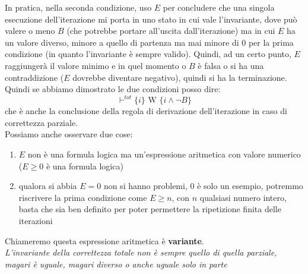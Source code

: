 \documentclass[a4paper,12pt, oneside]{book}
\begin{document}
In pratica, nella seconda condizione, uso $E$ per concludere che una singola
esecuzione dell'iterazione mi porta in uno stato in cui vale l'invariante, dove
può valere o meno $B$ (che potrebbe portare all'uscita dall'iterazione) ma in
cui $E$ ha un valore diverso, minore a quello di partenza ma mai minore di 0 per
la prima condizione (in quanto l'invariante è sempre valido). Quindi, ad un
certo punto, $E$ raggiungerà il valore minimo e in quel momento o $B$ è falsa o
si ha una contraddizione ($E$ dovrebbe diventare negativo), quindi si ha la
terminazione. \\
Quindi se abbiamo dimostrato le due condizioni posso dire:
\[\vdash^{tot}\{i\}\mbox{ W }\{i\land\neg B\}\]
che è anche la conclusione della regola di derivazione dell'iterazione in caso
di correttezza parziale.\\
Possiamo anche osservare due cose:
\begin{enumerate}
  \item $E$ non è una formula logica ma un'espressione aritmetica con valore
  numerico ($E\geq 0$ è una formula logica)
  \item qualora si abbia $E=0$ non si hanno problemi, $0$ è solo un esempio,
  potremmo riscrivere la prima condizione come $E\geq n$, con $n$ qualsiasi
  numero intero, basta che sia ben definito per poter permettere la ripetizione
  finita delle iterazioni
\end{enumerate}
Chiameremo questa espressione aritmetica è \textbf{variante}.\\
\textit{L'invariante della correttezza totale non è sempre quello di quella
  parziale, magari è uguale, magari diverso o anche uguale solo in parte}
\end{document}
